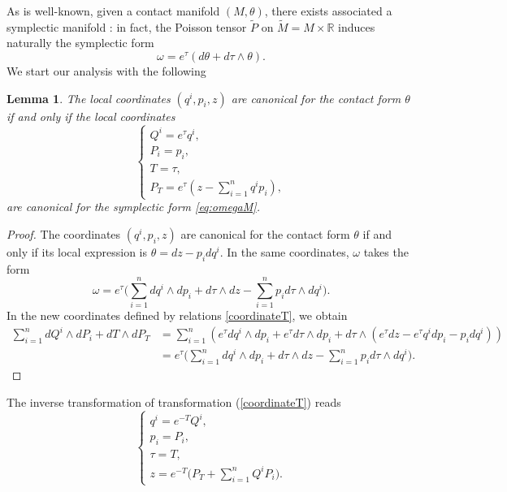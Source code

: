 \documentclass[10pt]{amsart}
\numberwithin{equation}{section}
\newcommand\noi{\noindent}
\newtheorem{lemma}{Lemma}
\theoremstyle{definition}
\begin{document}
As is well-known, given a contact manifold $(M,\theta)$, there exists associated a symplectic manifold \cite{ibanez1997co}: in fact, the Poisson tensor $\tilde{P}$ on $\tilde{M}=M\times\mathbb{R}$ induces naturally the symplectic form
\begin{equation} \label{eq:omegaM}
\omega=e^{\tau}(d\theta+d\tau\wedge \theta).
\end{equation}
We start our analysis with the following
\begin{lemma}
The local coordinates $(q^{i},p_{i},z)$ are canonical for the contact form $\theta$ if and only if the local coordinates
\begin{equation}
\label{coordinateT}
\left\lbrace\begin{array}{c}
Q^{i}=e^{\tau}q^{i},\\
P_{i}=p_{i},\\
T=\tau,\\
P_{T}=e^{\tau}(z-\displaystyle{\sum_{i=1}^{n}}q^{i}p_{i}),
\end{array}\right.
\end{equation}
are canonical for the symplectic form \eqref{eq:omegaM}.
\end{lemma}
\begin{proof}
The coordinates $(q^{i},p_{i},z)$ are canonical for the contact form $\theta$ if and only if its local expression is $\theta=dz-p_{i}dq^{i}$. In the same coordinates, $\omega$ takes the form
\begin{equation}
\omega= e^{\tau}\Big(\sum_{i=1}^{n}dq^{i}\wedge dp_{i}+d\tau\wedge dz-\sum_{i=1}^{n}p_{i}d\tau\wedge dq^{i}\Big).
\end{equation}
In the new coordinates defined by relations \eqref{coordinateT}, we obtain
\begin{equation}
\begin{split}
\sum_{i=1}^{n}dQ^{i}\wedge dP_{i}+dT\wedge dP_{T}&=\sum_{i=1}^{n}\left(e^{\tau}dq^{i}\wedge dp_{i}+e^{\tau}d\tau\wedge dp_{i}+d\tau\wedge(e^{\tau}dz-e^{\tau}q^{i}dp_{i}-p_{i}dq^{i})\right)\\
&=e^{\tau}\Big(\sum_{i=1}^{n}dq^{i}\wedge dp_{i}+d\tau\wedge dz-\sum_{i=1}^{n}p_{i}d\tau\wedge dq^{i}\Big).
\end{split}
\end{equation}
\end{proof}
\noi The inverse transformation of transformation (\ref{coordinateT}) reads
\begin{equation}
\label{coordinateinvT}
\left\lbrace\begin{array}{c}
q^{i}=e^{-T}Q^{i},\\
p_{i}=P_{i},\\
\tau=T,\\
z=e^{-T}\Big(P_{T}+\displaystyle{\sum_{i=1}^{n}}Q^{i}P_{i}\Big). 
\end{array}\right.
\end{equation}
\end{document}
